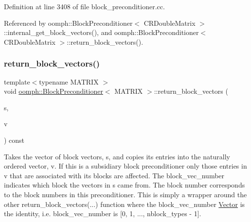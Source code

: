 Definition at line 3408 of file block\+\_\+preconditioner.\+cc.



Referenced by oomph\+::\+Block\+Preconditioner$<$ C\+R\+Double\+Matrix $>$\+::internal\+\_\+get\+\_\+block\+\_\+vectors(), and oomph\+::\+Block\+Preconditioner$<$ C\+R\+Double\+Matrix $>$\+::return\+\_\+block\+\_\+vectors().

\mbox{\label{classoomph_1_1BlockPreconditioner_a628f3ab6c3c41ccb449da642fb7e1feb}} 
\subsubsection{\texorpdfstring{return\+\_\+block\+\_\+vectors()}{return\_block\_vectors()}\hspace{0.1cm}{\footnotesize\ttfamily [2/2]}}
{\footnotesize\ttfamily template$<$typename M\+A\+T\+R\+IX $>$ \\
void \hyperlink{classoomph_1_1BlockPreconditioner}{oomph\+::\+Block\+Preconditioner}$<$ M\+A\+T\+R\+IX $>$\+::return\+\_\+block\+\_\+vectors (\begin{DoxyParamCaption}\item[{const \hyperlink{classoomph_1_1Vector}{Vector}$<$ \hyperlink{classoomph_1_1DoubleVector}{Double\+Vector} $>$ \&}]{s,  }\item[{\hyperlink{classoomph_1_1DoubleVector}{Double\+Vector} \&}]{v }\end{DoxyParamCaption}) const}



Takes the vector of block vectors, s, and copies its entries into the naturally ordered vector, v. If this is a subsidiary block preconditioner only those entries in v that are associated with its blocks are affected. The block\+\_\+vec\+\_\+number indicates which block the vectors in s came from. The block number corresponds to the block numbers in this preconditioner. This is simply a wrapper around the other return\+\_\+block\+\_\+vectors(...) function where the block\+\_\+vec\+\_\+number \hyperlink{classoomph_1_1Vector}{Vector} is the identity, i.\+e. block\+\_\+vec\+\_\+number is \mbox{[}0, 1, ..., nblock\+\_\+types -\/ 1\mbox{]}. 



